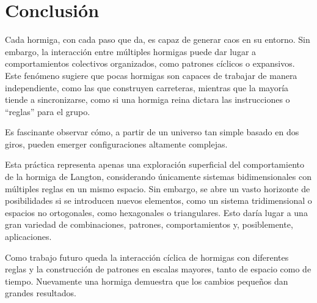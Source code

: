 \documentclass[12pt,twoside]{article}
\begin{document}
\clearpage
\section{Conclusión}

Cada hormiga, con cada paso que da, es capaz de generar caos en su entorno. Sin embargo, la interacción entre múltiples hormigas puede dar lugar a comportamientos colectivos organizados, como patrones cíclicos o expansivos. Este fenómeno sugiere que pocas hormigas son capaces de trabajar de manera independiente, como las que construyen carreteras, mientras que la mayoría tiende a sincronizarse, como si una hormiga reina dictara las instrucciones o ``reglas'' para el grupo.

Es fascinante observar cómo, a partir de un universo tan simple basado en dos giros, pueden emerger configuraciones altamente complejas. 

Esta práctica representa apenas una exploración superficial del comportamiento de la hormiga de Langton, considerando únicamente sistemas bidimensionales con múltiples reglas en un mismo espacio. Sin embargo, se abre un vasto horizonte de posibilidades si se introducen nuevos elementos, como un sistema tridimensional o espacios no ortogonales, como hexagonales o triangulares. Esto daría lugar a una gran variedad de combinaciones, patrones, comportamientos y, posiblemente, aplicaciones.

Como trabajo futuro queda la interacción cíclica de hormigas con diferentes reglas y la construcción de patrones en escalas mayores, tanto de espacio como de tiempo. Nuevamente una hormiga demuestra que los cambios pequeños dan grandes resultados.
\end{document}
